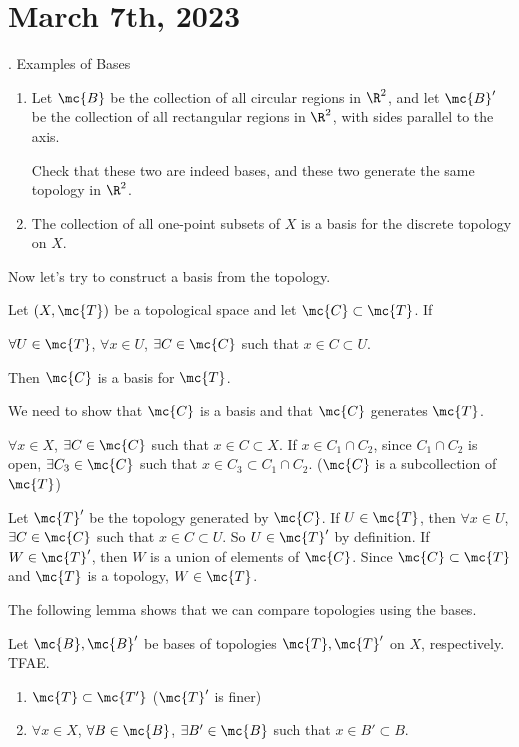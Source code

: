 \section*{March 7th, 2023}

\ex. Examples of Bases
\begin{enumerate}
    \item Let \(\mc{B}\) be the collection of all circular regions in \(\R^2\), and let \(\mc{B}'\) be the collection of all rectangular regions in \(\R^2\), with sides parallel to the axis.

          Check that these two are indeed bases, and these two generate the same topology in \(\R^2\).

    \item The collection of all one-point subsets of \(X\) is a basis for the discrete topology on \(X\).
\end{enumerate}

Now let's try to construct a basis from the topology.

 Let \((X, \mc{T})\) be a topological space and let \(\mc{C} \subset \mc{T}\). If
\begin{center}
    \(\forall U \in \mc{T}\), \(\forall x \in U\), \(\exists C \in \mc{C}\) such that \(x \in C \subset U\).
\end{center}
Then \(\mc{C}\) is a basis for \(\mc{T}\).

\pf We need to show that \(\mc{C}\) is a basis and that \(\mc{C}\) generates \(\mc{T}\).

 \(\forall x \in X\), \(\exists C \in \mc{C}\) such that \(x \in C \subset X\). If \(x \in C_1 \cap C_2\), since \(C_1 \cap C_2\) is open, \(\exists C_3 \in \mc{C}\) such that \(x \in C_3 \subset C_1\cap C_2\). (\(\mc{C}\) is a subcollection of \(\mc{T}\))

 Let \(\mc{T}'\) be the topology generated by \(\mc{C}\). If \(U \in \mc{T}\), then \(\forall x \in U\), \(\exists C \in \mc{C}\) such that \(x \in C \subset U\). So \(U \in \mc{T}'\) by definition. If \(W \in \mc{T}'\), then \(W\) is a union of elements of \(\mc{C}\). Since \(\mc{C} \subset \mc{T}\) and \(\mc{T}\) is a topology, \(W \in \mc{T}\).

The following lemma shows that we can compare topologies using the bases.

 Let \(\mc{B}, \mc{B}'\) be bases of topologies \(\mc{T}, \mc{T}'\) on \(X\), respectively. TFAE.
\begin{enumerate}
    \item \(\mc{T} \subset \mc{T'}\) (\(\mc{T}'\) is finer)
    \item \(\forall x \in X\), \(\forall B \in \mc{B}\), \(\exists B'\in \mc{B}\) such that \(x \in B' \subset B\).
\end{enumerate}

